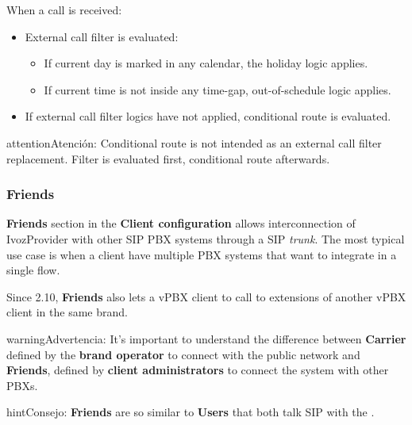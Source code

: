 \documentclass[letterpaper,10pt,spanish]{sphinxmanual}
\begin{document}
When a call is received:
\begin{itemize}
\item {} 
External call filter is evaluated:
\begin{itemize}
\item {} 
If current day is marked in any calendar, the holiday logic applies.

\item {} 
If current time is not inside any time-gap, out-of-schedule logic applies.

\end{itemize}

\item {} 
If external call filter logics have not applied, conditional route is evaluated.

\end{itemize}

\begin{notice}{attention}{Atención:}
Conditional route is not intended as an external call filter
replacement. Filter is evaluated first, conditional route afterwards.
\end{notice}


\subsubsection{Friends}
\label{administration_portal/client/vpbx/routing_endpoints/friends/index:friends}\label{administration_portal/client/vpbx/routing_endpoints/friends/index::doc}
\textbf{Friends} section in the \textbf{Client configuration} allows interconnection of
IvozProvider with other SIP PBX systems through a SIP \emph{trunk}. The most typical
use case is when a client have multiple PBX systems that want to integrate in
a single flow.

Since 2.10, \textbf{Friends} also lets a vPBX client to call to extensions of another
vPBX client in the same brand.

\begin{notice}{warning}{Advertencia:}
It's important to understand the difference between \textbf{Carrier}
defined by the \textbf{brand operator} to connect with the public network
and \textbf{Friends}, defined by \textbf{client administrators} to connect the
system with other PBXs.
\end{notice}

\begin{notice}{hint}{Consejo:}
\textbf{Friends} are so similar to \textbf{Users} that both talk SIP with the
{\hyperref[administration_portal/platform/infrastructure/proxy_users:proxyusers]{}}.
\end{notice}
\end{document}
